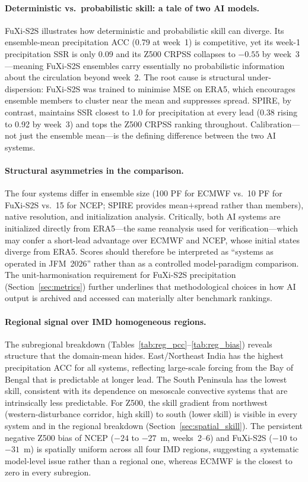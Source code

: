 \documentclass[11pt,a4paper]{article}
\begin{document}
\paragraph{Deterministic vs.\ probabilistic skill: a tale of two AI models.}
FuXi-S2S illustrates how deterministic and probabilistic skill can
diverge. Its ensemble-mean precipitation ACC (0.79 at week~1) is
competitive, yet its week-1 precipitation SSR is only 0.09 and its Z500
CRPSS collapses to $-0.55$ by week~3---meaning FuXi-S2S ensembles carry
essentially no probabilistic information about the circulation beyond
week~2. The root cause is structural under-dispersion: FuXi-S2S was
trained to minimise MSE on ERA5, which encourages ensemble members to
cluster near the mean and suppresses spread. SPIRE, by contrast,
maintains SSR closest to 1.0 for precipitation at every lead (0.38
rising to 0.92 by week~3) and tops the Z500 CRPSS ranking throughout.
Calibration---not just the ensemble mean---is the defining difference
between the two AI systems.

\paragraph{Structural asymmetries in the comparison.}
The four systems differ in ensemble size (100 PF for ECMWF vs.\ 10 PF
for FuXi-S2S vs.\ 15 for NCEP; SPIRE provides mean$+$spread rather than
members), native resolution, and initialization analysis. Critically,
both AI systems are initialized directly from ERA5---the same reanalysis
used for verification---which may confer a short-lead advantage over
ECMWF and NCEP, whose initial states diverge from ERA5. Scores should
therefore be interpreted as ``systems as operated in JFM~2026'' rather
than as a controlled model-paradigm comparison. The unit-harmonisation
requirement for FuXi-S2S precipitation (Section~\ref{sec:metrics})
further underlines that methodological choices in how AI output is
archived and accessed can materially alter benchmark rankings.

\paragraph{Regional signal over IMD homogeneous regions.}
The subregional breakdown (Tables~\ref{tab:reg_pcc}--\ref{tab:reg_bias})
reveals structure that the domain-mean hides. East/Northeast India has
the highest precipitation ACC for all systems, reflecting large-scale
forcing from the Bay of Bengal that is predictable at longer lead. The
South Peninsula has the lowest skill, consistent with its dependence on
mesoscale convective systems that are intrinsically less predictable.
For Z500, the skill gradient from northwest (western-disturbance
corridor, high skill) to south (lower skill) is visible in every system
and in the regional breakdown (Section~\ref{sec:spatial_skill}). The persistent
negative Z500 bias of NCEP ($-24$ to $-27$~m, weeks~2--6) and FuXi-S2S
($-10$ to $-31$~m) is spatially uniform across all four IMD regions,
suggesting a systematic model-level issue rather than a regional one,
whereas ECMWF is the closest to zero in every subregion.
\end{document}
